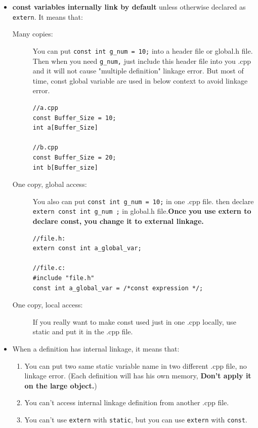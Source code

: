 \documentclass[a4paper,11pt,twoside]{book}
\begin{document}
\begin{itemize}
	\item \textbf{const variables internally link by default} unless otherwise declared as \texttt{extern}. It means that:
	\begin{description}
		\item[Many copies:] You can put \texttt{const int g\_num = 10;} into a header file or global.h file. Then when you need \texttt{g\_num,} just include this header file into you .cpp and it will not cause "multiple definition" linkage error. But most of time, const global variable are used in below context to avoid linkage error. 
\begin{lstlisting}[]
//a.cpp
const Buffer_Size = 10;
int a[Buffer_Size]

//b.cpp
const Buffer_Size = 20;
int b[Buffer_size]
\end{lstlisting}
		
		\item[One copy, global access:] You also can put \texttt{const int g\_num = 10;} in one .cpp file. then declare \texttt{extern const int g\_num ;} in global.h file.\textbf{Once you use extern to declare const, you change it to external linkage.} 
		
\begin{lstlisting}[numbers=none]
//file.h:
extern const int a_global_var;

//file.c:
#include "file.h"
const int a_global_var = /*const expression */;
\end{lstlisting}

		\item[One copy, local access:] If you really want to make const used just in one .cpp locally, use static and put it in the .cpp file.
	\end{description}
	
	\item When a definition has internal linkage, it means that:
\begin{enumerate}
		\item You can put two same static variable name in two different .cpp file, no linkage error. (Each definition will has his own memory, \textbf{Don't apply it on the large object.})
		
		\item You can't access internal linkage definition from another .cpp file. 
		
		\item You can't use \texttt{extern} with \texttt{static}, but you can use \texttt{extern} with \texttt{const}.
\end{enumerate}

\end{itemize}
\end{document}
